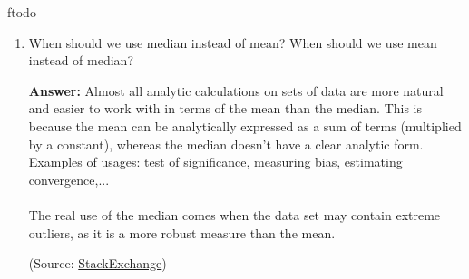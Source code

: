 ƒtodo\documentclass{article}
\newenvironment{QandA}{\begin{enumerate}[label=\arabic*.]}{\end{enumerate}}
\newenvironment{answer}{\par\normalfont \textbf{Answer:}}{}
\begin{document}
\begin{QandA}
    \item When should we use median instead of mean? When should we use mean instead of median?
    \begin{answer}
        Almost all analytic calculations on sets of data are more natural and easier to work with in terms of the mean than the median. This is because the mean can be analytically expressed as a sum of terms (multiplied by a constant), whereas the median doesn't have a clear analytic form. Examples of usages: test of significance, measuring bias, estimating convergence,... \\\\
        The real use of the median comes when the data set may contain extreme outliers, as it is a more robust measure than the mean. 
        
        (Source: \href{https://math.stackexchange.com/questions/2304710/mean-vs-median-when-to-use}{StackExchange})
    \end{answer}


\end{QandA}
\end{document}
